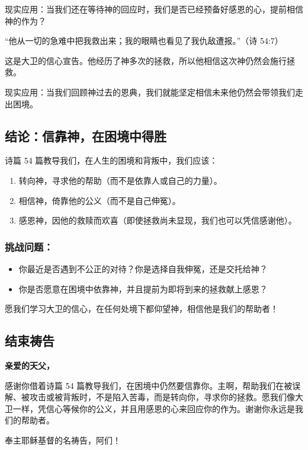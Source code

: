 \documentclass[a4paper, 12pt]{article}
\begin{document}
现实应用：当我们还在等待神的回应时，我们是否已经预备好感恩的心，提前相信神的作为？

\vspace{0.2cm}
“他从一切的急难中把我救出来；我的眼睛也看见了我仇敌遭报。”（诗 54:7）

这是大卫的信心宣告。他经历了神多次的拯救，所以他相信这次神仍然会施行拯救。

现实应用：当我们回顾神过去的恩典，我们就能坚定相信未来他仍然会带领我们走出困境。
\subsection*{结论：信靠神，在困境中得胜}
诗篇 54 篇教导我们，在人生的困境和背叛中，我们应该：
\begin{enumerate}
    \item 转向神，寻求他的帮助（而不是依靠人或自己的力量）。

    \item 相信神，倚靠他的公义（而不是自己伸冤）。

    \item 感恩神，因他的救赎而欢喜（即使拯救尚未显现，我们也可以凭信感谢他）。

\end{enumerate}
\subsubsection*{挑战问题：}
\begin{itemize}
    \item 你最近是否遇到不公正的对待？你是选择自我伸冤，还是交托给神？

    \item 你是否愿意在困境中依靠神，并且提前为即将到来的拯救献上感恩？

\end{itemize}

愿我们学习大卫的信心，在任何处境下都仰望神，相信他是我们的帮助者！

\subsection*{结束祷告}
\textbf{亲爱的天父，}

感谢你借着诗篇 54 篇教导我们，在困境中仍然要信靠你。主啊，帮助我们在被误解、被攻击或被背叛时，不是陷入苦毒，而是转向你，寻求你的拯救。愿我们像大卫一样，凭信心等候你的公义，并且用感恩的心来回应你的作为。谢谢你永远是我们的帮助者。

奉主耶稣基督的名祷告，阿们！
\newpage
\end{document}
